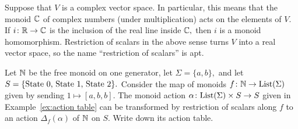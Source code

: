 \documentclass[CT4S-EN-RU]{subfiles}
\begin{document}
\begin{exampleENG}
Suppose that $V$ is a complex vector space. In particular, this means that the monoid ${\mathbb C}$ of complex numbers (under multiplication) acts on the elements of $V.$ If $i\colon{\mathbb R}\rightarrow{\mathbb C}$ is the inclusion of the real line inside ${\mathbb C},$ then $i$ is a monoid homomorphism. Restriction of scalars in the above sense turns $V$ into a real vector space, so the name “restriction of scalars” is apt.
\end{exampleENG}

\begin{exampleRUS}
\end{exampleRUS}

\begin{exerciseENG}
Let ${\mathbb N}$ be the free monoid on one generator, let $\Sigma=\{a,b\},$ and let $S=\{\textnormal{State 0, State 1, State 2}\}.$ Consider the map of monoids $f\colon{\mathbb N}\rightarrow\textnormal{List}(\Sigma)$ given by sending $1\mapsto [a,b,b].$ The monoid action $\alpha\colon\textnormal{List}(\Sigma)\times S\rightarrow S$ given in Example~\ref{ex:action table} can be transformed by restriction of scalars along $f$ to an action $\Delta_f(\alpha)$ of ${\mathbb N}$ on $S.$ Write down its action table.
\end{exerciseENG}

\begin{exerciseRUS}
\end{exerciseRUS}
\end{document}
